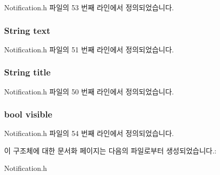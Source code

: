 Notification.\-h 파일의 53 번째 라인에서 정의되었습니다.

\hypertarget{struct_notification_extend_a685ed5195435d2b3e75433f46aec6e1e}{
\subsubsection[{text}]{\setlength{\rightskip}{0pt plus 5cm}String text}}\label{struct_notification_extend_a685ed5195435d2b3e75433f46aec6e1e}


Notification.\-h 파일의 51 번째 라인에서 정의되었습니다.

\hypertarget{struct_notification_extend_a499aeec850a240ae1aecd939c5043590}{
\subsubsection[{title}]{\setlength{\rightskip}{0pt plus 5cm}String title}}\label{struct_notification_extend_a499aeec850a240ae1aecd939c5043590}


Notification.\-h 파일의 50 번째 라인에서 정의되었습니다.

\hypertarget{struct_notification_extend_aa54a57ae048476d840caf6d4d2c47aa3}{
\subsubsection[{visible}]{\setlength{\rightskip}{0pt plus 5cm}bool visible}}\label{struct_notification_extend_aa54a57ae048476d840caf6d4d2c47aa3}


Notification.\-h 파일의 54 번째 라인에서 정의되었습니다.



이 구조체에 대한 문서화 페이지는 다음의 파일로부터 생성되었습니다.\-:\begin{DoxyCompactItemize}
\item 
Notification.\-h\end{DoxyCompactItemize}
